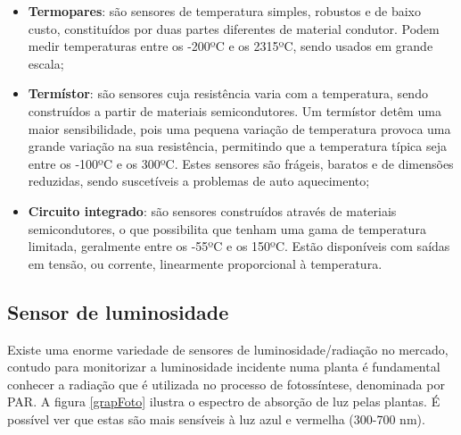 \begin{itemize}
	\item \textbf{Termopares}: são sensores de temperatura simples, robustos e de baixo custo, constituídos por duas partes diferentes de material condutor. Podem medir temperaturas entre os -200ºC e os 2315ºC, sendo usados em grande escala\cite{REOTEMPInstrumentCorporation}; 
	 
	
	\item \textbf{Termístor}: são sensores cuja resistência varia com a temperatura, sendo construídos a partir de materiais semicondutores. Um termístor detêm uma maior sensibilidade, pois uma pequena variação de temperatura provoca uma grande variação na sua resistência, permitindo que a temperatura típica seja entre os -100ºC e os 300ºC. Estes sensores são frágeis, baratos e de dimensões reduzidas, sendo suscetíveis a problemas de auto aquecimento\cite{TemperatureSensors};
	

	\item \textbf{Circuito integrado}: são sensores construídos através de materiais semicondutores, o que possibilita que tenham uma gama de temperatura limitada, geralmente entre os -55ºC e os 150ºC. 	Estão disponíveis com saídas em tensão, ou corrente, linearmente proporcional à temperatura. 


\end{itemize}





\subsection{Sensor de luminosidade }




Existe uma enorme variedade de sensores de luminosidade/radiação no mercado, contudo para monitorizar a luminosidade incidente numa planta é fundamental conhecer a radiação que é utilizada no processo de fotossíntese, denominada por \ac{PAR}. A figura \ref{grapFoto} ilustra o espectro de absorção de luz pelas plantas. É possível ver que estas são mais sensíveis à luz azul e vermelha (300-700 nm).






